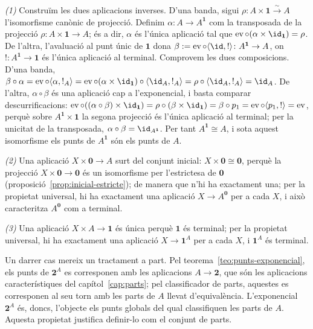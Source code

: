 \begin{prova}
\emph{(1)} Construïm les dues aplicacions inverses. D'una banda, sigui
\(\rho\colon A\times\mathbf1\xrightarrow{\sim}A\) l'isomorfisme
canònic de projecció. Definim \(\alpha\colon A\to A^{\mathbf1}\) com la
transposada de la projecció \(\rho\colon A\times\mathbf1\to A\); és a dir,
\(\alpha\) és l'única aplicació tal que
\(\operatorname{ev}\circ(\alpha\times\id_{\mathbf1})=\rho\). De l'altra, l'avaluació al punt únic de
\(\mathbf1\) dona \(\beta:=\operatorname{ev}\circ\langle\id,{!}\rangle
\colon A^{\mathbf1}\to A\), on \({!}\colon A^{\mathbf1}\to\mathbf1\) és l'única aplicació al
terminal. Comprovem les dues composicions. D'una banda,
\(\beta\circ\alpha=\operatorname{ev}\circ\langle\alpha,{!}_A\rangle
=\operatorname{ev}\circ(\alpha\times\id_{\mathbf1})\circ\langle\id_A,{!}_A\rangle
=\rho\circ\langle\id_A,{!}_A\rangle=\id_A\). De l'altra, \(\alpha\circ\beta\)
és una aplicació cap a l'exponencial, i basta comparar descurrificacions:
\(\operatorname{ev}\circ((\alpha\circ\beta)\times\id_{\mathbf1})
=\rho\circ(\beta\times\id_{\mathbf1})=\beta\circ p_1
=\operatorname{ev}\circ\langle p_1,{!}\rangle=\operatorname{ev}\),
perquè sobre \(A^{\mathbf1}\times\mathbf1\) la segona projecció és
l'única aplicació al terminal; per la unicitat de la transposada,
\(\alpha\circ\beta=\id_{A^{\mathbf1}}\). Per
tant \(A^{\mathbf1}\cong A\), i sota aquest isomorfisme els punts de
\(A^{\mathbf1}\) són els punts de \(A\).

\emph{(2)} Una aplicació \(X\times\mathbf0\to A\) surt del conjunt inicial:
\(X\times\mathbf0\cong\mathbf0\), perquè la projecció
\(X\times\mathbf0\to\mathbf0\) és un isomorfisme per l'estrictesa de
\(\mathbf0\) (proposició~\ref{prop:inicial-estricte}); de manera que n'hi ha exactament una; per la
propietat universal, hi ha exactament una aplicació \(X\to A^{\mathbf0}\)
per a cada \(X\), i això caracteritza \(A^{\mathbf0}\) com a terminal.

\emph{(3)} Una aplicació \(X\times A\to\mathbf1\) és única perquè
\(\mathbf1\) és terminal; per la propietat universal, hi ha exactament una
aplicació \(X\to\mathbf1^{A}\) per a cada \(X\), i \(\mathbf1^{A}\) és
terminal.
\end{prova}

Un darrer cas mereix un tractament a part. Pel
teorema~\ref{teo:punts-exponencial}, els punts de \(\mathbf2^{A}\) es
corresponen amb les aplicacions \(A\to\mathbf2\), que són les aplicacions
característiques del capítol~\ref{cap:parts}; pel classificador de parts,
aquestes es corresponen al seu torn amb les parts de \(A\) llevat
d'equivalència. L'exponencial \(\mathbf2^{A}\) és, doncs, l'objecte els
punts globals del qual classifiquen les parts de \(A\). Aquesta propietat
justifica definir-lo com el conjunt de parts.

